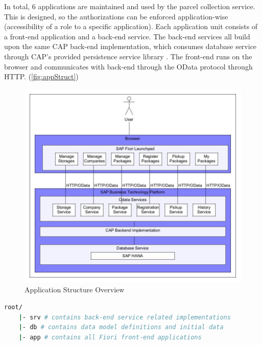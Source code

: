 In total, 6 applications are maintained and used by the parcel collection service. This is designed, so the authorizations can be enforced application-wise (accessibility of a role to a specific application). Each application unit consists of a front-end application and a back-end service.
The back-end services all build upon the same CAP back-end implementation, which consumes database service through CAP's provided persistence service library \cite{cap-java-persistencesrv}. The front-end runs on the browser and communicates with back-end through the OData protocol \cite{odata} through HTTP. (\autoref{fig:appStruct})


\begin{figure}[H]
	\centering
	\includegraphics[width=1\linewidth]{images/app_struct_new.jpg}
	\caption{Application Structure Overview}
	\label{fig:appStruct}
\end{figure}




\begin{lstlisting}[language={bash}]
root/
    |- srv # contains back-end service related implementations
    |- db # contains data model definitions and initial data
    |- app # contains all Fiori front-end applications
\end{lstlisting}

